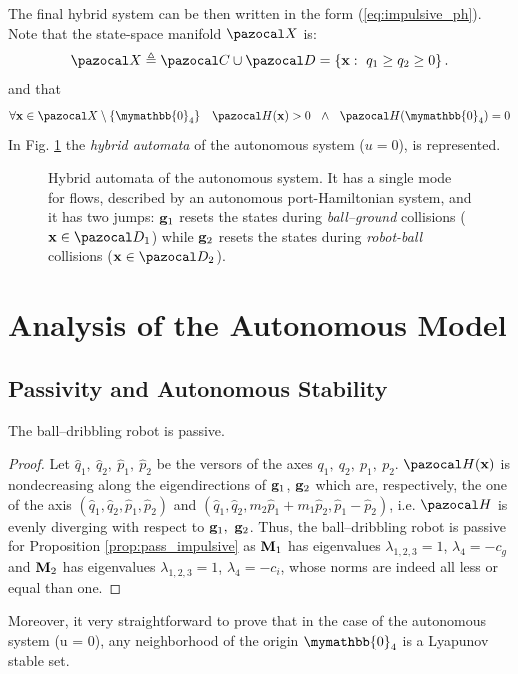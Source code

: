 %
The final hybrid system can be then written in the form (\ref{eq:impulsive_ph}).
%
Note that the state-space manifold $\X$ is:
\begin{equation}
    \X \triangleq \C\cup\D = \left\{\xb:~q_1\geq q_2\geq 0\right\}.
\end{equation}
%
and that
%
\begin{align}
    \forall \xb\in\X\setminus\{\mymathbb{0}_4\}~~~\Ha(\xb)>0~~\land~~\Ha(\mymathbb{0}_4)=0
\end{align}
In Fig. \ref{fig:uHPH} the \textit{hybrid automata} of the autonomous system ($u = 0$), is represented.
%
\begin{figure}[h]
	\centering
	
	\caption{Hybrid automata of the autonomous system. It has a single mode for flows, described by an autonomous port-Hamiltonian system, and it has two jumps: $\mathbf{g}_1$ resets the states during  \textit{ball--ground} collisions ($\xb\in\D_1$) while $\mathbf{g}_2$ resets the states during  \textit{robot-ball} collisions ($\xb\in\D_2$).}
	\label{fig:uHPH}
\end{figure}
\newpage

\section{Analysis of the Autonomous Model}\label{sec:analysis_aut}
\subsection{Passivity and Autonomous Stability}
%
\begin{prop}
    The ball--dribbling robot is passive.
\end{prop}
%
\begin{proof}
    Let $\hat{q}_1,~\hat{q}_2,~\hat{p}_1,~\hat{p}_2$ be the versors of the axes ${q}_1,~{q}_2,~{p}_1,~{p}_2$.
    $\Ha(\xb)$ is nondecreasing along the eigendirections of $\mathbf{g}_1$, $\mathbf{g}_2$ which are, respectively, the one of the axis $(\hat{q}_1,\hat{q}_2,\hat{p}_1,\hat{p}_2)$ and $(\hat{q}_1, \hat{q}_2,m_2\hat{p}_1 + m_1\hat{p}_2,\hat{p}_1-\hat{p}_2)$, i.e. $\Ha$ is evenly diverging with respect to $\mathbf{g}_1,~\mathbf{g}_2$.
    Thus, the ball--dribbling robot is passive for Proposition \ref{prop:pass_impulsive} as
    $\mathbf{M}_1$ has eigenvalues $\lambda_{1,2,3} = 1$, $\lambda_4 = -c_g$ and $\mathbf{M}_2$ has eigenvalues $\lambda_{1,2,3} = 1$, $\lambda_4 = -c_i$, whose norms are indeed all less or equal than one.
\end{proof}
%
Moreover, it very straightforward to prove that in the case of the autonomous system (u = 0), any neighborhood of the origin $\mymathbb{0}_4$ is a Lyapunov stable set.
%

